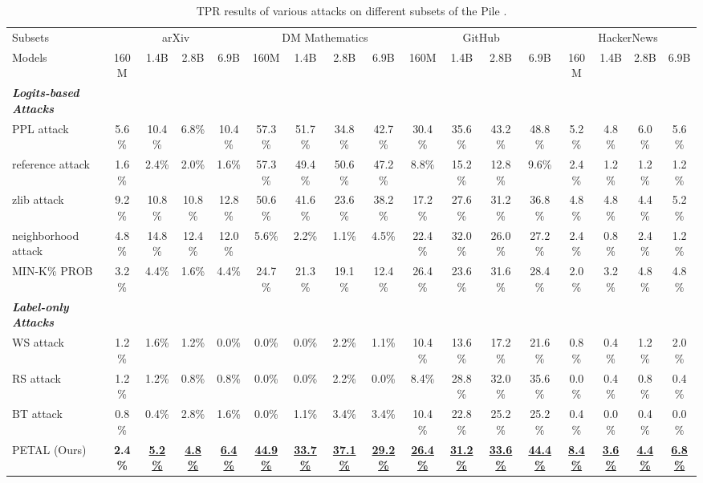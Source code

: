 \begin{table*}[!t]
\centering
\setlength{\tabcolsep}{3.6pt}
\caption{TPR results of various attacks on different subsets of the Pile \cite{gao2020pile}.}
\vspace{-2mm}
\scalebox{0.78}
{
\begin{tabular}{l|cccccccccccccccc}
\toprule
Subsets & \multicolumn{4}{c}{arXiv}&  \multicolumn{4}{c}{DM Mathematics}& \multicolumn{4}{c}{GitHub}& \multicolumn{4}{c}{HackerNews}\\
\cmidrule(l{5pt}r{5pt}){2-5}\cmidrule(l{5pt}r{5pt}){6-9}\cmidrule(l{5pt}r{5pt}){10-13}\cmidrule(l{5pt}r{5pt}){14-17}
Models & 160M& 1.4B& 2.8B& 6.9B& 160M& 1.4B& 2.8B& 6.9B& 160M& 1.4B& 2.8B& 6.9B& 160M& 1.4B& 2.8B& 6.9B\\
\midrule
\textbf{\textit{Logits-based Attacks}}&&&&&&&&&&&&\\
PPL attack&5.6\%&10.4\%&6.8\%&10.4\%&57.3\%&51.7\%&34.8\%&42.7\%&30.4\%&35.6\%&43.2\%&48.8\%&5.2\%&4.8\%&6.0\%&5.6\%\\
reference attack&1.6\%&2.4\%&2.0\%&1.6\%&57.3\%&49.4\%&50.6\%&47.2\%&8.8\%&15.2\%&12.8\%&9.6\%&2.4\%&1.2\%&1.2\%&1.2\%\\
zlib attack&9.2\%&10.8\%&10.8\%&12.8\%&50.6\%&41.6\%&23.6\%&38.2\%&17.2\%&27.6\%&31.2\%&36.8\%&4.8\%&4.8\%&4.4\%&5.2\%\\
neighborhood attack&4.8\%&14.8\%&12.4\%&12.0\%&5.6\%&2.2\%&1.1\%&4.5\%&22.4\%&32.0\%&26.0\%&27.2\%&2.4\%&0.8\%&2.4\%&1.2\%\\
MIN-K\% PROB&3.2\%&4.4\%&1.6\%&4.4\%&24.7\%&21.3\%&19.1\%&12.4\%&26.4\%&23.6\%&31.6\%&28.4\%&2.0\%&3.2\%&4.8\%&4.8\%\\
\textbf{\textit{Label-only Attacks}}&&&&&&&&&&&&\\
WS attack&1.2\%&1.6\%&1.2\%&0.0\%&0.0\%&0.0\%&2.2\%&1.1\%&10.4\%&13.6\%&17.2\%&21.6\%&0.8\%&0.4\%&1.2\%&2.0\%\\
RS attack&1.2\%&1.2\%&0.8\%&0.8\%&0.0\%&0.0\%&2.2\%&0.0\%&8.4\%&28.8\%&32.0\%&35.6\%&0.0\%&0.4\%&0.8\%&0.4\%\\
BT attack&0.8\%&0.4\%&2.8\%&1.6\%&0.0\%&1.1\%&3.4\%&3.4\%&10.4\%&22.8\%&25.2\%&25.2\%&0.4\%&0.0\%&0.4\%&0.0\%\\
PETAL (Ours)&\textbf{2.4\%}&\ul{\textbf{5.2\%}}&\ul{\textbf{4.8\%}}&\ul{\textbf{6.4\%}}&\ul{\textbf{44.9\%}}&\ul{\textbf{33.7\%}}&\ul{\textbf{37.1\%}}&\ul{\textbf{29.2\%}}&\ul{\textbf{26.4\%}}&\ul{\textbf{31.2\%}}&\ul{\textbf{33.6\%}}&\ul{\textbf{44.4\%}}&\ul{\textbf{8.4\%}}&\ul{\textbf{3.6\%}}&\ul{\textbf{4.4\%}}&\ul{\textbf{6.8\%}}\\

\end{tabular}}
\end{table*}
